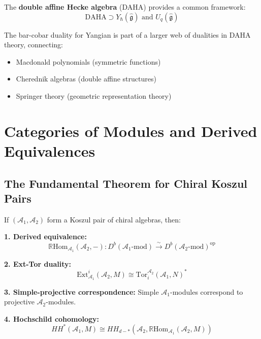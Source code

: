 \begin{remark}
The \textbf{double affine Hecke algebra} (DAHA) provides a common framework:
$$\text{DAHA} \supset Y_{\hbar}(\widehat{\mathfrak{g}}) \text{ and } U_q(\widehat{\mathfrak{g}})$$

The bar-cobar duality for Yangian is part of a larger web of dualities in DAHA 
theory, connecting:
\begin{itemize}
\item Macdonald polynomials (symmetric functions)
\item Cherednik algebras (double affine structures)
\item Springer theory (geometric representation theory)
\end{itemize}
\end{remark}


\section{Categories of Modules and Derived Equivalences}

\subsection{The Fundamental Theorem for Chiral Koszul Pairs}

\begin{theorem}
If $(\mathcal{A}_1, \mathcal{A}_2)$ form a Koszul pair of chiral algebras, then:

\textbf{1. Derived equivalence:}
$$\mathbb{R}\text{Hom}_{\mathcal{A}_1}(\mathcal{A}_2, -): D^b(\mathcal{A}_1\text{-mod}) \xrightarrow{\sim} D^b(\mathcal{A}_2\text{-mod})^{\text{op}}$$

\textbf{2. Ext-Tor duality:}
$$\text{Ext}^i_{\mathcal{A}_1}(\mathcal{A}_2, M) \cong \text{Tor}_i^{\mathcal{A}_2}(\mathcal{A}_1, N)^*$$

\textbf{3. Simple-projective correspondence:}
Simple $\mathcal{A}_1$-modules correspond to projective $\mathcal{A}_2$-modules.

\textbf{4. Hochschild cohomology:}
$$HH^*(\mathcal{A}_1, M) \cong HH_{d-*}(\mathcal{A}_2, \mathbb{R}\text{Hom}_{\mathcal{A}_1}(\mathcal{A}_2, M))$$
\end{theorem}


